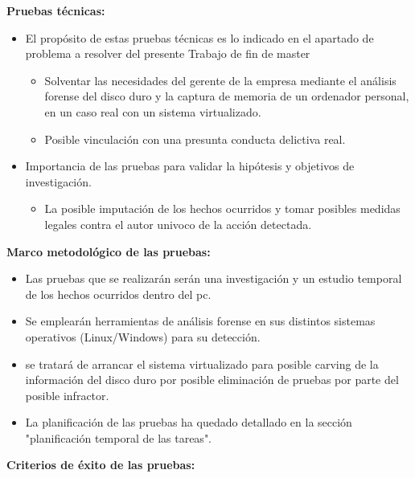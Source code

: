 \textbf{Pruebas técnicas:}

\begin{itemize}
    \item El propósito de estas pruebas técnicas es lo indicado en el apartado de problema a resolver del presente Trabajo de fin de master
    \begin{itemize}
        \item Solventar las necesidades del gerente de la empresa mediante el análisis forense del disco duro y la captura de memoria de un ordenador personal, en un caso real con un sistema virtualizado.
        \item Posible vinculación con una presunta conducta delictiva real.
    \end{itemize}
    \item Importancia de las pruebas para validar la hipótesis y objetivos de investigación.
    \begin{itemize}
        \item La posible imputación de los hechos ocurridos y tomar posibles medidas legales contra el autor univoco de la acción detectada.
    \end{itemize}
\end{itemize}

\textbf{Marco metodológico de las pruebas:}

\begin{itemize}
    \item Las pruebas que se realizarán serán una investigación y un estudio temporal de los hechos ocurridos dentro del pc.
    \item Se emplearán herramientas de análisis forense en sus distintos sistemas operativos (Linux/Windows) para su detección.
    \item se tratará de arrancar el sistema virtualizado para posible carving de la información del disco duro por posible eliminación de pruebas por parte del posible infractor.
    \item La planificación de las pruebas ha quedado detallado en la sección "planificación temporal de las tareas".
\end{itemize}


\textbf{Criterios de éxito de las pruebas:}





